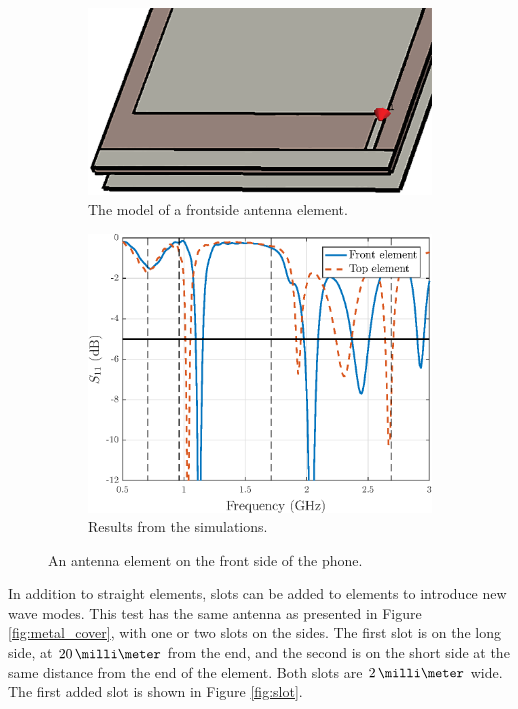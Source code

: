\begin{figure}[H]
    \vspace{-7pt}
    \centering
    \begin{subfigure}[b]{0.49\textwidth}
        \includegraphics[width=\textwidth]{img/front.eps}
        \caption{The model of a frontside antenna element.}
        \label{fig:front_model}
    \end{subfigure}
    \begin{subfigure}[b]{0.49\textwidth}
        \includegraphics[width=\textwidth]{img/front_res.eps}
        \caption{Results from the simulations.}
        \label{fig:front_res}
    \end{subfigure}
    \caption{An antenna element on the front side of the phone.}
    \label{fig:front_elem}
\end{figure}

In addition to straight elements, slots can be added to elements to introduce new wave modes. This test has the same antenna as presented in Figure \ref{fig:metal_cover}, with one or two slots on the sides. The first slot is on the long side, at $20\,\milli\meter$ from the end, and the second is on the short side at the same distance from the end of the element. Both slots are $2\,\milli\meter$ wide. The first added slot is shown in Figure \ref{fig:slot}.


